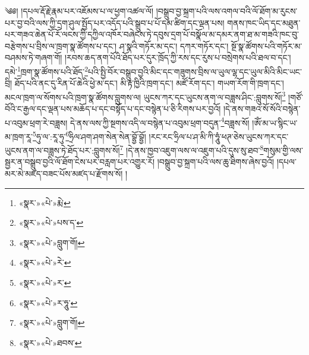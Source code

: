 ༄༅། །དཔལ་རྡོ་རྗེ་རྣམ་པར་འཇོམས་པ་ལ་ཕྱག་འཚལ་ལོ། །བསྒྲུབ་བྱ་སྐྲག་པའི་ལས་འགལ་བའི་ལོ་ཐོག་མ་རུངས་པར་བྱ་བའི་ལས་ཀྱི་དྲག་ཤུལ་སྤྱོད་པར་འདོད་པའི་སྒྲུབ་པ་པོ་དམ་ཚིག་དང་ལྡན་པས། གནས་ཁང་ཡིད་དང་མཐུན་པར་གཟའ་ཆེན་པོ་རོ་ལངས་ཀྱི་དཀྱིལ་འཁོར་བཞེངས་ཏེ་དབུས་དྲག་པོ་བསྣོལ་མ་དམར་ནག་ཐ་མ་གཟའི་ཁང་བུ་བརྩེགས་པ་བྲིས་ལ་ཁྲག་སྣ་ཚོགས་པ་དང་། ཤ་སྣའི་གཏོར་མ་དང་། དཀར་གཏོར་དང་། སྔོ་སྣ་ཚོགས་པའི་གཏོར་མ་བཤམས་ཏེ་གཞག་གོ། །རབས་ཆད་ནག་པོའི་ཐོད་པར་དུར་ཁྲོད་ཀྱི་རས་དང་རུས་པ་བསྲེགས་པའི་ཐལ་བ་དང་། དམེ་\footnote{«སྣར་»«པེ་»རྨེ་}ཁྲག་སྣ་ཚོགས་པའི་ཐོད་\footnote{«སྣར་»«པེ་»པས་ད་}པའི་སྤྱི་བོར་བསྒྲུབ་བྱའི་མིང་དང་གཟུགས་བྲིས་ལ་ཡུལ་ལྷ་དང་ཡུལ་མིའི་མིང་ཡང་བྲི། ཐོད་པའི་ནང་དུ་རིན་པོ་ཆེའི་ཕྱེ་མ་དང་། མི་རྟ་ཁྱིའི་ཁྲག་དང་། མཛོ་རོག་དང་། གཡག་རོག་གི་ཁྲག་དང་། མངལ་ཁྲག་ལ་སོགས་པའི་ཁྲག་སྣ་ཚོགས་བླུགས་ལ། ཡུངས་ཀར་དང་ཡུངས་ནག་ལ་བཟླས་ཤིང་:བླུགས་སོ།\footnote{«སྣར་»«པེ་»བླུག་གོ།} །གཙོ་བོའི་ང་རྒྱལ་དང་ལྡན་པས་མཆོད་པ་དང་བསྟོད་པ་དང་བསྙེན་པ་ཅི་རིགས་པར་བྱའོ། །དེ་ནས་གཟའ་སོ་སོའི་བསྙེན་པ་འབུམ་ཕྲག་རེ་བཟླས། དེ་ནས་ལས་ཀྱི་སྔགས་འདི་ལ་བསྙེན་པ་འབུམ་ཕྲག་བདུན་\footnote{«སྣར་»«པེ་»རེ་}བཟླས་སོ། །ཨོཾ་མ་ཡ་སྙིང་ཡ་མ་ཁྲག་རཱ་\footnote{«སྣར་»«པེ་»ར་}ཧུ་ལ་:རཱ་ཧུ་\footnote{«སྣར་»«པེ་»ར་ཧཱུ་}ཧྲིལ་ཤག་ཤག་སེན་སེན་བྷྱོ་བྷྱོ། །རང་རང་ཧྲིལ་པ་ཤ་མི་ཀི་ཧཱུཾ་ཕཊ་ཅེས་ཡུངས་ཀར་དང་ཡུངས་ནག་ལ་བཟླས་ཏེ་ཐོད་པར་:བླུགས་སོ།\footnote{«སྣར་»«པེ་»བླུག་གོ།} །དེ་ནས་ཁྱབ་འཇུག་ལས་ལ་འཇུག་པའི་དུས་སུ་ཐབ་\footnote{«སྣར་»«པེ་»ཐབས་}གསུམ་གྱི་ལས་སྦྱར་ན་བསྒྲུབ་བྱའི་ལོ་ཐོག་ངེས་པར་བརླག་པར་འགྱུར་རོ། །བསྒྲུབ་བྱ་སྐྲག་པའི་ལས་ཆུ་ཐིགས་ཞེས་བྱའོ། །དཔལ་མར་མེ་མཛད་བཟང་པོས་མཛད་པ་རྫོགས་སོ། ། 